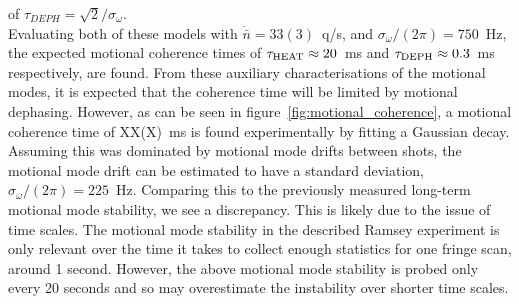     of $\tau_{DEPH} = \sqrt{2}/\sigma_{\omega}$.\\
    Evaluating both of these models with $\dot{\bar{n}}=33(3)$~q/s, and
    $\sigma_{\omega}/(2\pi) = 750$~Hz, the expected motional coherence times of $\tau_{\rm
    HEAT} \approx 20$~ms and $\tau_{\rm DEPH} \approx 0.3$~ms respectively, are found. From these auxiliary characterisations of the motional modes, it is expected that the coherence time will be limited by motional dephasing.  However, as can be
    seen in figure~\ref{fig:motional_coherence}, a
    motional coherence time of XX(X)~ms is found experimentally by fitting a Gaussian decay.  \\
    Assuming this was dominated by motional mode drifts between shots, the motional mode drift can be estimated to have a standard deviation, $\sigma_{\omega}/(2\pi) =
    225$~Hz. Comparing this to the previously measured long-term motional mode
    stability, we see a discrepancy. This is likely due to the issue of time
    scales. The motional mode stability in the described Ramsey experiment is
    only relevant over the time it takes to collect enough statistics for one
    fringe scan, around 1 second. However, the above motional mode stability is
    probed only every 20 seconds and so may overestimate the instability over
    shorter time scales.\\ 


